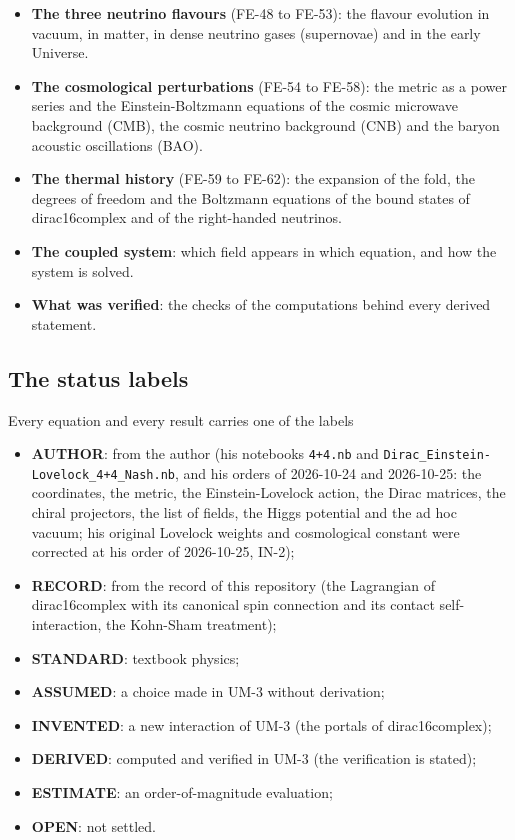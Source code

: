 \documentclass[
  10pt,
]{article}
\providecommand{\tightlist}{%
  \setlength{\itemsep}{0pt}\setlength{\parskip}{0pt}}
\begin{document}
\begin{itemize}
  four-dimensional couplings, the masses with the ad hoc vacuum, the
  mixing matrices and the four-dimensional couplings of the bound states
  of dirac16complex.
\item
  \textbf{The three neutrino flavours} (FE-48 to FE-53): the flavour
  evolution in vacuum, in matter, in dense neutrino gases (supernovae)
  and in the early Universe.
\item
  \textbf{The cosmological perturbations} (FE-54 to FE-58): the metric
  as a power series and the Einstein-Boltzmann equations of the cosmic
  microwave background (CMB), the cosmic neutrino background (CNB) and
  the baryon acoustic oscillations (BAO).
\item
  \textbf{The thermal history} (FE-59 to FE-62): the expansion of the
  fold, the degrees of freedom and the Boltzmann equations of the bound
  states of dirac16complex and of the right-handed neutrinos.
\item
  \textbf{The coupled system}: which field appears in which equation,
  and how the system is solved.
\item
  \textbf{What was verified}: the checks of the computations behind
  every derived statement.
\end{itemize}

\hypertarget{the-status-labels}{%
\subsection{The status labels}\label{the-status-labels}}

Every equation and every result carries one of the labels

\begin{itemize}
\tightlist
\item
  \textbf{AUTHOR}: from the author (his notebooks \texttt{4+4.nb} and
  \texttt{Dirac\_Einstein-Lovelock\_4+4\_Nash.nb}, and his orders of
  2026-10-24 and 2026-10-25: the coordinates, the metric, the
  Einstein-Lovelock action, the Dirac matrices, the chiral projectors,
  the list of fields, the Higgs potential and the ad hoc vacuum; his
  original Lovelock weights and cosmological constant were corrected at
  his order of 2026-10-25, IN-2);
\item
  \textbf{RECORD}: from the record of this repository (the Lagrangian of
  dirac16complex with its canonical spin connection and its contact
  self-interaction, the Kohn-Sham treatment);
\item
  \textbf{STANDARD}: textbook physics;
\item
  \textbf{ASSUMED}: a choice made in UM-3 without derivation;
\item
  \textbf{INVENTED}: a new interaction of UM-3 (the portals of
  dirac16complex);
\item
  \textbf{DERIVED}: computed and verified in UM-3 (the verification is
  stated);
\item
  \textbf{ESTIMATE}: an order-of-magnitude evaluation;
\item
  \textbf{OPEN}: not settled.
\end{itemize}
\end{document}

